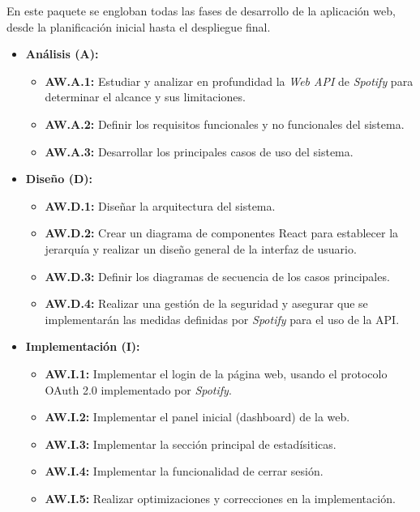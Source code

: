 En este paquete se engloban todas las fases de desarrollo de la aplicación web, desde la planificación inicial hasta el despliegue final.

\begin{itemize}
    \item \textbf{Análisis (A):}
          \begin{itemize}
              \item \textbf{AW.A.1:} Estudiar y analizar en profundidad la \textit{Web API} de \textit{Spotify} para determinar el alcance y sus limitaciones.
              \item \textbf{AW.A.2:} Definir los requisitos funcionales y no funcionales del sistema.
              \item \textbf{AW.A.3:} Desarrollar los principales casos de uso del sistema.
          \end{itemize}

          \vspace{2em}

    \item \textbf{Diseño (D):}
          \begin{itemize}
              \item \textbf{AW.D.1:} Diseñar la arquitectura del sistema.
              \item \textbf{AW.D.2:} Crear un diagrama de componentes React para establecer la jerarquía y realizar un diseño general de la interfaz de usuario.
              \item \textbf{AW.D.3:} Definir los diagramas de secuencia de los casos principales.
              \item \textbf{AW.D.4:} Realizar una gestión de la seguridad y asegurar que se implementarán las medidas definidas por \textit{Spotify} para el uso de la API.
          \end{itemize}

    \item \textbf{Implementación (I):}
          \begin{itemize}
              \item \textbf{AW.I.1:} Implementar el login de la página web, usando el protocolo OAuth 2.0 implementado por \textit{Spotify}.
              \item \textbf{AW.I.2:} Implementar el panel inicial (dashboard) de la web.
              \item \textbf{AW.I.3:} Implementar la sección principal de estadísiticas.
              \item \textbf{AW.I.4:} Implementar la funcionalidad de cerrar sesión.
              \item \textbf{AW.I.5:} Realizar optimizaciones y correcciones en la implementación.
          \end{itemize}


\end{itemize}
